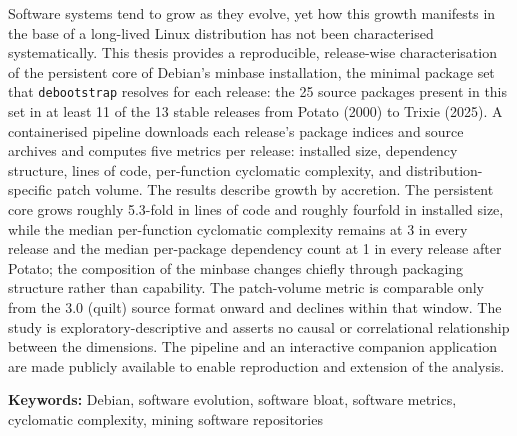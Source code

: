Software systems tend to grow as they evolve, yet how this growth manifests in the base of a long-lived Linux distribution has not been characterised systematically. This thesis provides a reproducible, release-wise characterisation of the persistent core of Debian's minbase installation, the minimal package set that \texttt{debootstrap} resolves for each release: the 25 source packages present in this set in at least 11 of the 13 stable releases from Potato (2000) to Trixie (2025). A containerised pipeline downloads each release's package indices and source archives and computes five metrics per release: installed size, dependency structure, lines of code, per-function cyclomatic complexity, and distribution-specific patch volume. The results describe growth by accretion. The persistent core grows roughly 5.3-fold in lines of code and roughly fourfold in installed size, while the median per-function cyclomatic complexity remains at 3 in every release and the median per-package dependency count at 1 in every release after Potato; the composition of the minbase changes chiefly through packaging structure rather than capability. The patch-volume metric is comparable only from the 3.0 (quilt) source format onward and declines within that window. The study is exploratory-descriptive and asserts no causal or correlational relationship between the dimensions. The pipeline and an interactive companion application are made publicly available to enable reproduction and extension of the analysis.

\vspace{6em} 

\noindent\textbf{Keywords:} Debian, software evolution, software bloat, software metrics, cyclomatic complexity, mining software repositories
